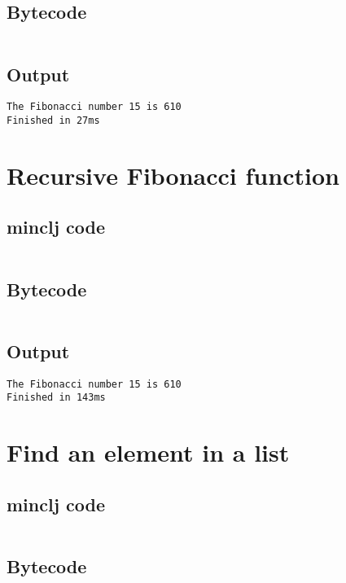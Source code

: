 \documentclass[11pt]{scrreprt}
\begin{document}
\subsection{Bytecode}
\inputminted{text}{/home/mario/git/MarioJim/miniclj/examples/cyclic_fibonacci.mclj}

\subsection{Output}
\begin{verbatim}
The Fibonacci number 15 is 610
Finished in 27ms
\end{verbatim}


\section{Recursive Fibonacci function}
\subsection{minclj code}
\inputminted{clojure}{/home/mario/git/MarioJim/miniclj/examples/recursive_fibonacci.clj}

\subsection{Bytecode}
\inputminted{text}{/home/mario/git/MarioJim/miniclj/examples/recursive_fibonacci.mclj}

\subsection{Output}
\begin{verbatim}
The Fibonacci number 15 is 610
Finished in 143ms
\end{verbatim}


\section{Find an element in a list}
\subsection{minclj code}
\inputminted{clojure}{/home/mario/git/MarioJim/miniclj/examples/find_in_list.clj}

\subsection{Bytecode}
\inputminted{text}{/home/mario/git/MarioJim/miniclj/examples/find_in_list.mclj}
\end{document}
